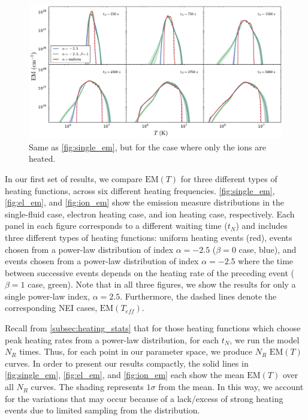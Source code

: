 \documentclass[apj]{emulateapj}
\begin{document}
	\begin{figure}
		\centering
		\includegraphics[width=2\columnwidth]{figures/em_grid_ion_a25.pdf}
		\caption{Same as \autoref{fig:single_em}, but for the case where only the ions are heated.}
		\label{fig:ion_em}
	\end{figure}
	\par In our first set of results, we compare $\mathrm{EM}(T)$ for three different types of heating functions, across six different heating frequencies. \autoref{fig:single_em}, \autoref{fig:el_em}, and \autoref{fig:ion_em} show the emission measure distributions in the single-fluid case, electron heating case, and ion heating case, respectively. Each panel in each figure corresponds to a different waiting time ($t_N$) and includes three different types of heating functions: uniform heating events (red), events chosen from a power-law distribution of index $\alpha=-2.5$ ($\beta=0$ case, blue), and events chosen from a power-law distribution of index $\alpha=-2.5$ where the time between successive events depends on the heating rate of the preceding event ($\beta=1$ case, green). Note that in all three figures, we show the results for only a single power-law index, $\alpha=2.5$. Furthermore, the dashed lines denote the corresponding NEI cases, $\mathrm{EM}(T_{eff})$.
	\par Recall from \autoref{subsec:heating_stats} that for those heating functions which choose peak heating rates from a power-law distribution, for each $t_N$, we run the model $N_R$ times. Thus, for each point in our parameter space, we produce $N_R$ $\mathrm{EM}(T)$ curves. In order to present our results compactly, the solid lines in \autoref{fig:single_em}, \autoref{fig:el_em}, and \autoref{fig:ion_em} each show the mean $\mathrm{EM}(T)$ over all $N_R$ curves. The shading represents $1\sigma$ from the mean. In this way, we account for the variations that may occur because of a lack/excess of strong heating events due to limited sampling from the distribution.
\end{document}
